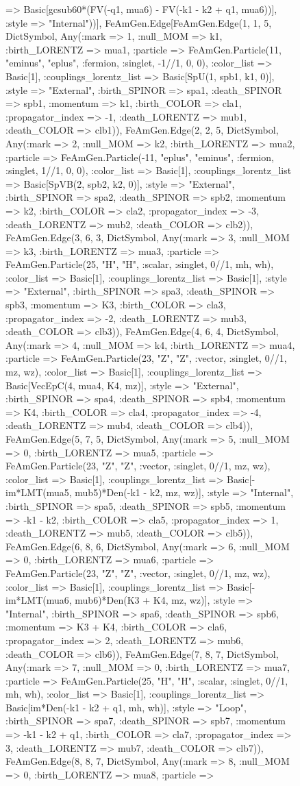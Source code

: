 \documentclass{revtex4}
\begin{document}
\begin{figure}[!htb]
\begin{center}
{=> Basic[gcsub60*(FV(-q1, mua6) - FV(-k1 - k2 + q1, mua6))], :style => "Internal"))], FeAmGen.Edge[FeAmGen.Edge(1, 1, 5, Dict{Symbol, Any}(:mark => 1, :null_MOM => k1, :birth_LORENTZ => mua1, :particle => FeAmGen.Particle(11, "eminus", "eplus", :fermion, :singlet, -1//1, 0, 0), :color_list => Basic[1], :couplings_lorentz_list => Basic[SpU(1, spb1, k1, 0)], :style => "External", :birth_SPINOR => spa1, :death_SPINOR => spb1, :momentum => k1, :birth_COLOR => cla1, :propagator_index => -1, :death_LORENTZ => mub1, :death_COLOR => clb1)), FeAmGen.Edge(2, 2, 5, Dict{Symbol, Any}(:mark => 2, :null_MOM => k2, :birth_LORENTZ => mua2, :particle => FeAmGen.Particle(-11, "eplus", "eminus", :fermion, :singlet, 1//1, 0, 0), :color_list => Basic[1], :couplings_lorentz_list => Basic[SpVB(2, spb2, k2, 0)], :style => "External", :birth_SPINOR => spa2, :death_SPINOR => spb2, :momentum => k2, :birth_COLOR => cla2, :propagator_index => -3, :death_LORENTZ => mub2, :death_COLOR => clb2)), FeAmGen.Edge(3, 6, 3, Dict{Symbol, Any}(:mark => 3, :null_MOM => k3, :birth_LORENTZ => mua3, :particle => FeAmGen.Particle(25, "H", "H", :scalar, :singlet, 0//1, mh, wh), :color_list => Basic[1], :couplings_lorentz_list => Basic[1], :style => "External", :birth_SPINOR => spa3, :death_SPINOR => spb3, :momentum => K3, :birth_COLOR => cla3, :propagator_index => -2, :death_LORENTZ => mub3, :death_COLOR => clb3)), FeAmGen.Edge(4, 6, 4, Dict{Symbol, Any}(:mark => 4, :null_MOM => k4, :birth_LORENTZ => mua4, :particle => FeAmGen.Particle(23, "Z", "Z", :vector, :singlet, 0//1, mz, wz), :color_list => Basic[1], :couplings_lorentz_list => Basic[VecEpC(4, mua4, K4, mz)], :style => "External", :birth_SPINOR => spa4, :death_SPINOR => spb4, :momentum => K4, :birth_COLOR => cla4, :propagator_index => -4, :death_LORENTZ => mub4, :death_COLOR => clb4)), FeAmGen.Edge(5, 7, 5, Dict{Symbol, Any}(:mark => 5, :null_MOM => 0, :birth_LORENTZ => mua5, :particle => FeAmGen.Particle(23, "Z", "Z", :vector, :singlet, 0//1, mz, wz), :color_list => Basic[1], :couplings_lorentz_list => Basic[-im*LMT(mua5, mub5)*Den(-k1 - k2, mz, wz)], :style => "Internal", :birth_SPINOR => spa5, :death_SPINOR => spb5, :momentum => -k1 - k2, :birth_COLOR => cla5, :propagator_index => 1, :death_LORENTZ => mub5, :death_COLOR => clb5)), FeAmGen.Edge(6, 8, 6, Dict{Symbol, Any}(:mark => 6, :null_MOM => 0, :birth_LORENTZ => mua6, :particle => FeAmGen.Particle(23, "Z", "Z", :vector, :singlet, 0//1, mz, wz), :color_list => Basic[1], :couplings_lorentz_list => Basic[-im*LMT(mua6, mub6)*Den(K3 + K4, mz, wz)], :style => "Internal", :birth_SPINOR => spa6, :death_SPINOR => spb6, :momentum => K3 + K4, :birth_COLOR => cla6, :propagator_index => 2, :death_LORENTZ => mub6, :death_COLOR => clb6)), FeAmGen.Edge(7, 8, 7, Dict{Symbol, Any}(:mark => 7, :null_MOM => 0, :birth_LORENTZ => mua7, :particle => FeAmGen.Particle(25, "H", "H", :scalar, :singlet, 0//1, mh, wh), :color_list => Basic[1], :couplings_lorentz_list => Basic[im*Den(-k1 - k2 + q1, mh, wh)], :style => "Loop", :birth_SPINOR => spa7, :death_SPINOR => spb7, :momentum => -k1 - k2 + q1, :birth_COLOR => cla7, :propagator_index => 3, :death_LORENTZ => mub7, :death_COLOR => clb7)), FeAmGen.Edge(8, 8, 7, Dict{Symbol, Any}(:mark => 8, :null_MOM => 0, :birth_LORENTZ => mua8, :particle => }
\end{center}
\end{figure}
\end{document}

